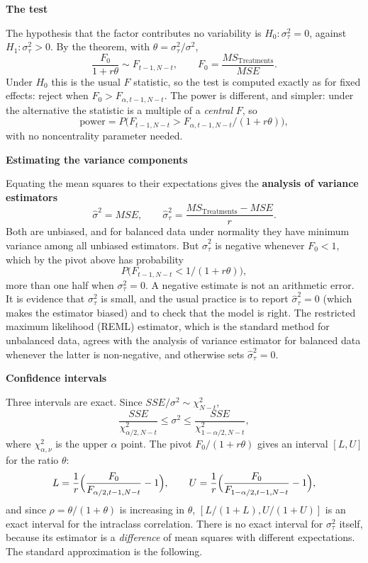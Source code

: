 \documentclass[11pt,a4paper]{article}
\numberwithin{equation}{section}
\theoremstyle{definition}
\newcommand{\subhead}[1]{%
  \par\medskip\noindent\textbf{#1}\par\nobreak\smallskip}
\begin{document}
\subhead{The test}
The hypothesis that the factor contributes no variability is $H_0 : \sigma^2_\tau = 0$, against $H_1 : \sigma^2_\tau > 0$. By the theorem, with $\theta = \sigma^2_\tau/\sigma^2$,
\[
\frac{F_0}{1 + r\theta} \sim F_{t-1, N-t} , \qquad F_0 = \frac{MS_{\mathrm{Treatments}}}{MSE} .
\]
Under $H_0$ this is the usual $F$ statistic, so the test is computed exactly as for fixed effects: reject when $F_0 > F_{\alpha, t-1, N-t}$. The power is different,
and simpler: under the alternative the statistic is a multiple of a \emph{central} $F$, so
\[
\text{power} = P\bigl(F_{t-1, N-t} > F_{\alpha, t-1, N-t}/(1 + r\theta)\bigr) ,
\]
with no noncentrality parameter needed.

\subhead{Estimating the variance components}
Equating the mean squares to their expectations gives the \textbf{analysis of variance estimators}
\[
\hat\sigma^2 = MSE , \qquad \hat\sigma^2_\tau = \frac{MS_{\mathrm{Treatments}} - MSE}r .
\]
Both are unbiased, and for balanced data under normality they have minimum variance among all unbiased estimators. But $\hat\sigma^2_\tau$ is negative
whenever $F_0 < 1$, which by the pivot above has probability
\[
P\bigl(F_{t-1, N-t} < 1/(1 + r\theta)\bigr) ,
\]
more than one half when $\sigma^2_\tau = 0$. A negative estimate is not an arithmetic error. It is evidence that $\sigma^2_\tau$ is small, and the usual practice is to report
$\hat\sigma^2_\tau = 0$ (which makes the estimator biased) and to check that the model is right. The restricted maximum likelihood (REML) estimator, which
is the standard method for unbalanced data, agrees with the analysis of variance estimator for balanced data whenever the latter is non-negative, and
otherwise sets $\hat\sigma^2_\tau = 0$.

\subhead{Confidence intervals}
Three intervals are exact. Since $SSE/\sigma^2 \sim \chi^2_{N-t}$,
\[
\frac{SSE}{\chi^2_{\alpha/2, N-t}} \le \sigma^2 \le \frac{SSE}{\chi^2_{1-\alpha/2, N-t}} ,
\]
where $\chi^2_{\alpha, \nu}$ is the upper $\alpha$ point. The pivot $F_0/(1 + r\theta)$ gives an interval $[L, U]$ for the ratio $\theta$:
\[
L = \frac1r\Bigl(\frac{F_0}{F_{\alpha/2, t-1, N-t}} - 1\Bigr) , \qquad U = \frac1r\Bigl(\frac{F_0}{F_{1-\alpha/2, t-1, N-t}} - 1\Bigr) ,
\]
and since $\rho = \theta/(1 + \theta)$ is increasing in $\theta$, $[L/(1 + L), U/(1 + U)]$ is an exact interval for the intraclass correlation. There is no exact interval for $\sigma^2_\tau$
itself, because its estimator is a \emph{difference} of mean squares with different expectations. The standard approximation is the following.
\end{document}
